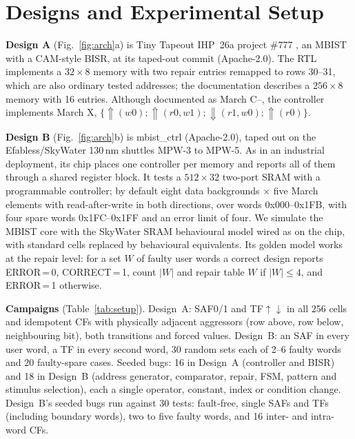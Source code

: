 \documentclass[conference]{IEEEtran}
\begin{document}


\section{Designs and Experimental Setup}
\label{sec:setup}
\textbf{Design A} (Fig.~\ref{fig:arch}a) is Tiny Tapeout IHP~26a project \#777 \cite{tt777}, an
MBIST with a CAM-style BISR, at its taped-out commit (Apache-2.0). The RTL implements a
$32\times8$ memory with two repair entries remapped to rows 30--31, which are also ordinary tested
addresses; the documentation describes a $256\times8$ memory with 16 entries. Although documented
as March C--, the controller implements March X,
$\{\Uparrow(w0);\Uparrow(r0,w1);\Downarrow(r1,w0);\Uparrow(r0)\}$.

\textbf{Design B} (Fig.~\ref{fig:arch}b) is mbist\_ctrl \cite{mbistctrl} (Apache-2.0), taped out
on the Efabless/SkyWater 130\,nm shuttles MPW-3 to MPW-5. As in an industrial deployment, its chip
places one controller per memory and reports all of them through a shared register block. It tests a $512\times32$ two-port SRAM with a programmable
controller; by default eight data backgrounds $\times$ five March elements with read-after-write
in both directions, over words 0x000--0x1FB, with four spare words 0x1FC--0x1FF and an error limit
of four. We simulate the MBIST core with the SkyWater SRAM behavioural model wired as on the chip,
with standard cells replaced by behavioural equivalents. Its golden model works at the repair
level: for a set $W$ of faulty user words a correct design reports ERROR\,=\,0, CORRECT\,=\,1,
count $|W|$ and repair table $W$ if $|W|\le4$, and ERROR\,=\,1 otherwise.

\textbf{Campaigns} (Table~\ref{tab:setup}). Design~A: SAF0/1 and TF$\uparrow\downarrow$ in all 256
cells and idempotent CFs with physically adjacent aggressors (row above, row below, neighbouring
bit), both transitions and forced values. Design~B: an SAF in every user word, a TF in every
second word, 30 random sets each of 2--6 faulty words and 20 faulty-spare cases. Seeded bugs: 16
in Design~A (controller and BISR) and 18 in Design~B (address generator, comparator, repair,
FSM, pattern and stimulus selection), each a single operator, constant, index or condition change.
Design~B's seeded bugs run against 30 tests: fault-free, single SAFs and TFs (including boundary
words), two to five faulty words, and 16 inter- and intra-word CFs.
\end{document}
